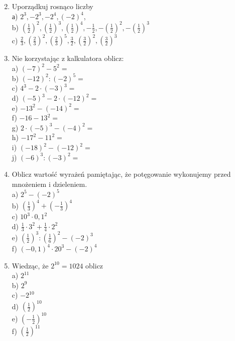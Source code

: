 \documentclass[10pt]{article}
\begin{document}
\begin{enumerate}
  \setcounter{enumi}{1}
  \item Uporządkuj rosnąco liczby\\
а) \(2^{3},-2^{3},-2^{4},(-2)^{4}\),\\
b) \(\left(\frac{1}{2}\right)^{2},\left(\frac{1}{2}\right)^{3},\left(\frac{1}{2}\right)^{4},-\frac{1}{2},-\left(\frac{1}{2}\right)^{2},-\left(\frac{1}{2}\right)^{3}\)\\
c) \(\frac{2}{3},\left(\frac{2}{3}\right)^{2},\left(\frac{2}{3}\right)^{5}, \frac{3}{2},\left(\frac{3}{2}\right)^{2},\left(\frac{3}{2}\right)^{3}\)
  \item Nie korzystając z kalkulatora oblicz:\\
a) \((-7)^{2}-5^{2}=\)\\
b) \((-12)^{2}:(-2)^{5}=\)\\
c) \(4^{3}-2 \cdot(-3)^{3}=\)\\
d) \((-5)^{3}-2 \cdot(-12)^{2}=\)\\
e) \(-13^{2}-(-14)^{2}=\)\\
f) \(-16-13^{2}=\)\\
g) \(2 \cdot(-5)^{3}-(-4)^{2}=\)\\
h) \(-17^{2}-11^{2}=\)\\
i) \((-18)^{2}-(-12)^{2}=\)\\
j) \((-6)^{3}:(-3)^{2}=\)
  \item Oblicz wartość wyrażeń pamiętając, że potęgowanie wykonujemy przed mnożeniem i dzieleniem.\\
a) \(2^{5}-(-2)^{5}\)\\
b) \(\left(\frac{1}{3}\right)^{4}+\left(-\frac{1}{3}\right)^{4}\)\\
c) \(10^{3} \cdot 0,1^{2}\)\\
d) \(\frac{1}{3} \cdot 3^{2}+\frac{1}{4} \cdot 2^{2}\)\\
e) \(\left(\frac{1}{2}\right)^{3}:\left(\frac{1}{6}\right)^{2}-(-2)^{3}\)\\
f) \((-0,1)^{4} \cdot 20^{3}-(-2)^{4}\)
  \item Wiedząc, że \(2^{10}=1024\) oblicz\\
a) \(2^{11}\)\\
b) \(2^{9}\)\\
c) \(-2^{10}\)\\
d) \(\left(\frac{1}{2}\right)^{10}\)\\
e) \(\left(-\frac{1}{2}\right)^{10}\)\\
f) \(\left(\frac{1}{2}\right)^{11}\)\\

\end{enumerate}
\end{document}
